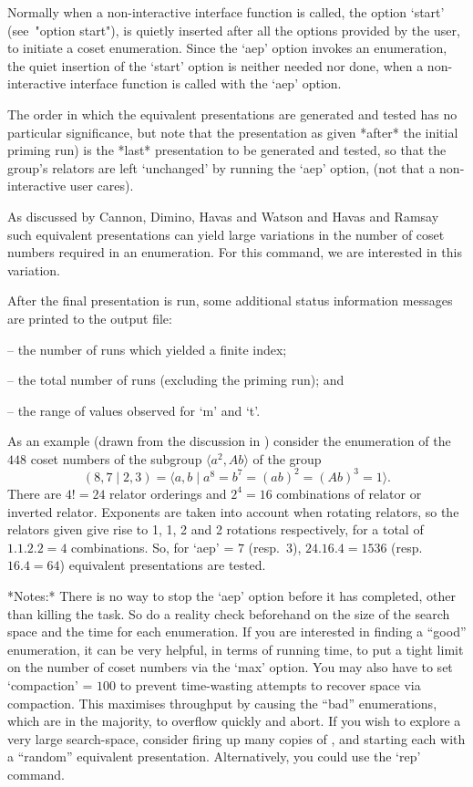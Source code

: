 Normally when a non-interactive {\ACE} interface function  is  called,
the option `start' (see~"option start"), is quietly inserted after all
the options provided by the user, to  initiate  a  coset  enumeration.
Since the `aep' option invokes an enumeration, the quiet insertion  of
the `start' option is neither needed nor done, when a  non-interactive
{\ACE} interface function is called with the `aep' option.

The order in which the  equivalent  presentations  are  generated  and
tested has no particular significance, but note that the  presentation
as given *after* the initial priming run) is the  *last*  presentation
to be generated and tested, so that  the  group's  relators  are  left
`unchanged' by running the `aep' option, (not that  a  non-interactive
user cares).

As discussed by Cannon, Dimino, Havas  and  Watson  \cite{CDHW73}  and
Havas and Ramsay \cite{HR99b} such equivalent presentations can  yield
large variations in  the  number  of  coset  numbers  required  in  an
enumeration. For this command, we are interested in this variation.

After  the  final  presentation  is  run,   some   additional   status
information messages are printed to the {\ACE} output file:

\beginlist
\item{--}  the number of runs which yielded a finite index; 
\item{--}  the total number of runs (excluding the priming run); and 
\item{--}  the range of values observed for `m' and `t'.
\endlist

As an example (drawn from the discussion in \cite{HR99a}) consider the
enumeration   of   the   $448$   coset   numbers   of   the   subgroup
$\langle  a^2,Ab \rangle$ of the group
$$ (8,7 \mid 2,3) 
    = \langle a,b \mid a^8 = b^7 = (ab)^2 = (Ab)^3 = 1 \rangle. $$
There are $4!=24$  relator  orderings  and  $2^4=16$  combinations  of
relator or inverted relator. Exponents are  taken  into  account  when
rotating relators, so the relators given give rise to 1, 1,  2  and  2
rotations respectively, for a total of $1.1.2.2=4$  combinations.  So,
for  `aep'  =  $7$   (resp.~$3$),   $24.16.4=1536$   (resp.~$16.4=64$)
equivalent presentations are tested.

*Notes:*
There is no way to stop the `aep'  option  before  it  has  completed,
other than killing the task. So do a reality check beforehand  on  the
size of the search space and the time for each enumeration. If you are
interested in finding a ``good'' enumeration, it can be very  helpful,
in terms of running time, to put a tight limit on the number of  coset
numbers via the `max' option. You may also have to set `compaction'  =
$100$  to  prevent  time-wasting  attempts  to   recover   space   via
compaction.  This  maximises  throughput  by   causing   the   ``bad''
enumerations, which are in  the  majority,  to  overflow  quickly  and
abort. If you wish to explore  a  very  large  search-space,  consider
firing up many copies of {\ACE}, and starting each with  a  ``random''
equivalent  presentation.  Alternatively,  you  could  use  the  `rep'
command.

